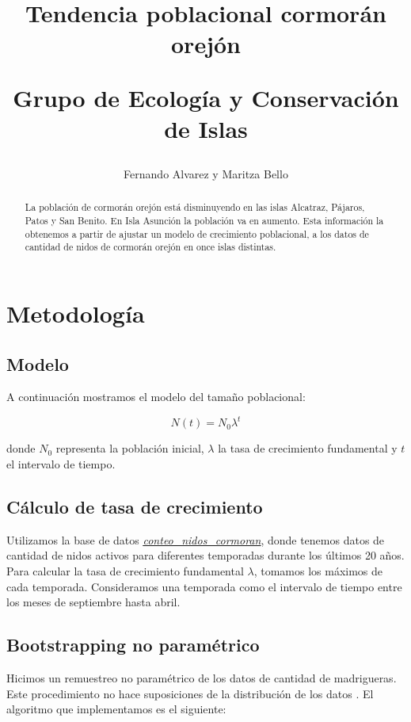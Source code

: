 \documentclass{article} %
\author{Fernando Alvarez y Maritza Bello}
\title{Tendencia poblacional cormorán orejón \\ \begin{large} Grupo de Ecología y Conservación de Islas \end{large}}
\begin{document}
\maketitle

\begin{abstract}
La población de cormorán orejón está disminuyendo en las islas Alcatraz, Pájaros, Patos y San Benito. En Isla Asunción la población va en aumento. Esta información la obtenemos a partir de ajustar un modelo de crecimiento poblacional, a los datos de cantidad de nidos de cormorán orejón en once islas distintas.

\end{abstract}

\section*{Metodología}
\subsection*{Modelo}
A continuación mostramos el modelo del tamaño poblacional:

\begin{equation}
N(t)=N_{0}\lambda^{t}
\end{equation}

\noindent donde $N_{0}$ representa la población inicial, $\lambda$ la tasa de crecimiento fundamental y $t$ el intervalo de tiempo. 

\subsection*{Cálculo de tasa de crecimiento}

Utilizamos la base de datos \href{https://drive.google.com/drive/folders/1aXmotwcGcZjK52USWMdlZoffaMUlI0tT}{{\color{blue}\textit{\underline{conteo\_nidos\_cormoran}}}}, donde tenemos datos de cantidad de nidos activos para diferentes temporadas durante los últimos 20 años. Para calcular la tasa de crecimiento fundamental $\lambda$, tomamos los máximos de cada temporada. Consideramos una temporada como el intervalo de tiempo entre los meses de septiembre hasta abril.

\subsection*{Bootstrapping no paramétrico}

Hicimos un remuestreo no paramétrico de los datos de cantidad de madrigueras. Este procedimiento no hace suposiciones de la distribución de los datos \cite{carpenter2000bootstrap}. El algoritmo que implementamos es el siguiente: 
\end{document}

